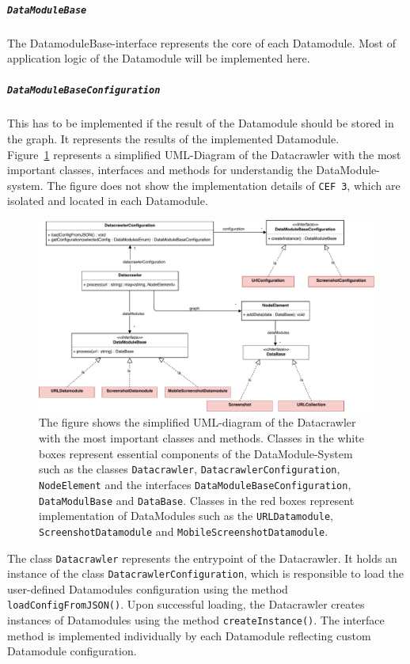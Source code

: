 \subparagraph*{\texttt{DataModuleBase}}
	The DatamoduleBase-interface represents the core of each Datamodule. Most of application logic of the Datamodule will be implemented here.


\subparagraph*{\texttt{DataModuleBaseConfiguration}}
	This has to be implemented if the result of the Datamodule should be stored in the graph. It represents the results of the implemented Datamodule.\\
	
Figure~\ref{datacrawler_uml_diagram} represents a simplified UML-Diagram of the Datacrawler with the most important classes, interfaces and methods for understandig the DataModule-system. The figure does not show the implementation details of \texttt{CEF 3}, which are isolated and located in each Datamodule.

\begin{figure}
	\centering
	\includegraphics[scale=0.5]{resources/datacrawler_uml_diagram}
	\caption[UML-Diagram of the Datacrawler]{The figure shows the simplified UML-diagram of the Datacrawler with the most important classes and methods. Classes in the white boxes represent essential components of the DataModule-System such as the classes \texttt{Datacrawler}, \texttt{DatacrawlerConfiguration}, \texttt{NodeElement} and the interfaces \texttt{DataModuleBaseConfiguration}, \texttt{DataModulBase} and \texttt{DataBase}. Classes in the red boxes represent implementation of DataModules such as the \texttt{URLDatamodule}, \texttt{ScreenshotDatamodule} and \texttt{MobileScreenshotDatamodule}.}
	\label{datacrawler_uml_diagram}
\end{figure}

The class \texttt{Datacrawler} represents the entrypoint of the Datacrawler. It holds an instance of the class \texttt{DatacrawlerConfiguration}, which is responsible to load the user-defined Datamodules configuration using the method \texttt{loadConfigFromJSON()}. Upon successful loading, the Datacrawler creates instances of Datamodules using the method \texttt{createInstance()}. The interface method is implemented individually by each Datamodule reflecting custom Datamodule configuration. 


